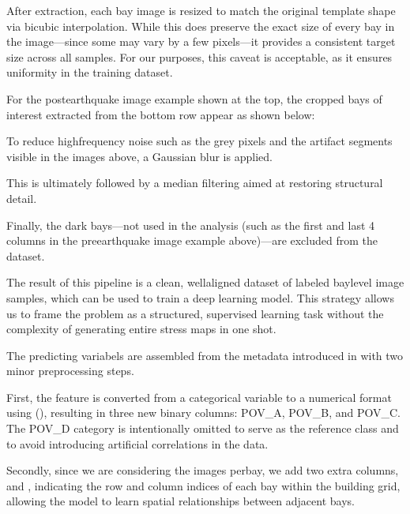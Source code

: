 \documentclass[letterpaper,10pt,english]{sphinxmanual}
\begin{document}
\sphinxAtStartPar
After extraction, each bay image is resized to match the original template
shape via bicubic interpolation.
While this does  preserve the exact size of every bay in the image—since
some may vary by a few pixels—it provides a consistent target size across all
samples.
For our purposes, this caveat is acceptable, as it ensures uniformity in the
training dataset.

\sphinxAtStartPar
For the post\sphinxhyphen{}earthquake image example shown at the top, the cropped bays of
interest extracted from the bottom row appear as shown below:



\sphinxAtStartPar
To reduce high\sphinxhyphen{}frequency noise such as the grey pixels and the artifact segments
visible in the images above, a Gaussian blur is applied.



\sphinxAtStartPar
This is ultimately followed by a median filtering aimed at restoring structural
detail.



\sphinxAtStartPar
Finally, the dark bays—not used in the analysis (such as the first and last 4
columns in the pre\sphinxhyphen{}earthquake image example above)—are excluded from the dataset.

\sphinxAtStartPar
\textendash{}

\sphinxAtStartPar
The result of this pipeline is a clean, well\sphinxhyphen{}aligned dataset of labeled
bay\sphinxhyphen{}level image samples, which can be used to train a deep learning model.
This strategy allows us to frame the problem as a structured, supervised
learning task without the complexity of generating entire stress maps in one
shot.

\sphinxAtStartPar
The predicting variabels are assembled from the metadata introduced in
 with two minor preprocessing steps.

\sphinxAtStartPar
First, the  feature is converted from a categorical variable to a
numerical format using  (), resulting in three new
binary columns: POV\_A, POV\_B, and POV\_C.
The POV\_D category is intentionally omitted to serve as the reference class
and to avoid introducing artificial correlations in the data.

\sphinxAtStartPar
Secondly, since we are considering the images per\sphinxhyphen{}bay, we add two extra columns,
 and , indicating the row and column indices of each bay within the
building grid, allowing the model to learn spatial relationships between
adjacent bays.
\end{document}
